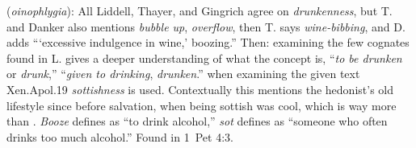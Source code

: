 \item[Wine alcoholic,]

(\textit{oinophlygia}):
All Liddell, Thayer, and Gingrich agree on \emph{drunkenness}, but T. and Danker also mentions \emph{bubble up}, \emph{overflow}, then T. says \emph{wine-bibbing}, and D. adds ```excessive indulgence in wine,' boozing.''
Then: examining the few cognates found in L. gives a deeper understanding of what the concept is,  ``\emph{to be drunken} or \emph{drunk},''  ``\emph{given to drinking}, \emph{drunken}.''
when examining the given text Xen.Apol.19 \emph{sottishness} is used.
Contextually this mentions the hedonist's old lifestyle since before salvation, when being sottish was cool, which is way more than . \emph{Booze} defines as ``to drink alcohol,'' \emph{sot} defines as ``someone who often drinks too much alcohol.''
Found in 1~Pet 4:3.
